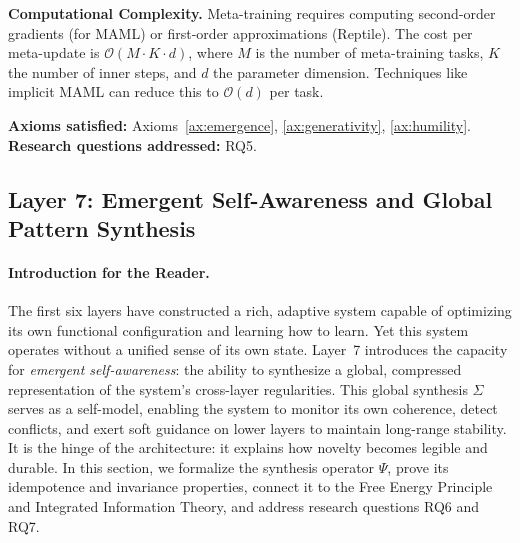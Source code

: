 \textbf{Computational Complexity.} Meta-training requires computing second-order gradients (for MAML) or first-order approximations (Reptile). The cost per meta-update is $\mathcal{O}(M \cdot K \cdot d)$, where $M$ is the number of meta-training tasks, $K$ the number of inner steps, and $d$ the parameter dimension. Techniques like implicit MAML can reduce this to $\mathcal{O}(d)$ per task.

\textbf{Axioms satisfied:} Axioms~\ref{ax:emergence}, \ref{ax:generativity}, \ref{ax:humility}. \\
\textbf{Research questions addressed:} RQ5.

\subsection{Layer 7: Emergent Self-Awareness and Global Pattern Synthesis}
\label{subsec:layer7}

\paragraph{Introduction for the Reader.}
The first six layers have constructed a rich, adaptive system capable of optimizing its own functional configuration and learning how to learn. Yet this system operates without a unified sense of its own state. Layer~7 introduces the capacity for \emph{emergent self-awareness}: the ability to synthesize a global, compressed representation of the system's cross-layer regularities. This global synthesis $\Sigma$ serves as a self-model, enabling the system to monitor its own coherence, detect conflicts, and exert soft guidance on lower layers to maintain long-range stability. It is the hinge of the architecture: it explains how novelty becomes legible and durable. In this section, we formalize the synthesis operator $\Psi$, prove its idempotence and invariance properties, connect it to the Free Energy Principle and Integrated Information Theory, and address research questions RQ6 and RQ7.

